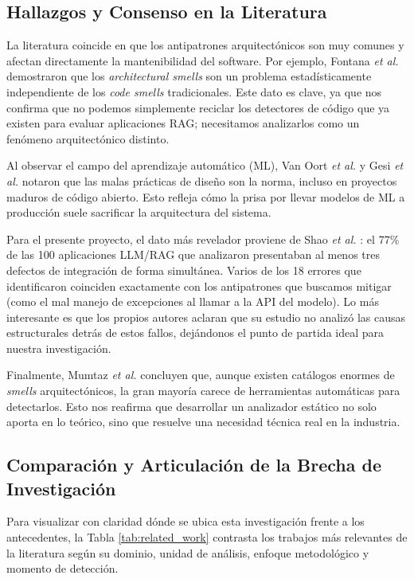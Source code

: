 \subsection{Hallazgos y Consenso en la Literatura}
La literatura coincide en que los antipatrones arquitectónicos son muy comunes y afectan directamente la mantenibilidad del software. Por ejemplo, Fontana \textit{et al.} \cite{arcelli_fontana_are_2019} demostraron que los \textit{architectural smells} son un problema estadísticamente independiente de los \textit{code smells} tradicionales. Este dato es clave, ya que nos confirma que no podemos simplemente reciclar los detectores de código que ya existen para evaluar aplicaciones RAG; necesitamos analizarlos como un fenómeno arquitectónico distinto.

Al observar el campo del aprendizaje automático (ML), Van Oort \textit{et al.} \cite{oort_prevalence_2021} y Gesi \textit{et al.} \cite{gesi_code_2022} notaron que las malas prácticas de diseño son la norma, incluso en proyectos maduros de código abierto. Esto refleja cómo la prisa por llevar modelos de ML a producción suele sacrificar la arquitectura del sistema.

Para el presente proyecto, el dato más revelador proviene de Shao \textit{et al.} \cite{shao_are_2024}: el 77\% de las 100 aplicaciones LLM/RAG que analizaron presentaban al menos tres defectos de integración de forma simultánea. Varios de los 18 errores que identificaron coinciden exactamente con los antipatrones que buscamos mitigar (como el mal manejo de excepciones al llamar a la API del modelo). Lo más interesante es que los propios autores aclaran que su estudio no analizó las causas estructurales detrás de estos fallos, dejándonos el punto de partida ideal para nuestra investigación.

Finalmente, Mumtaz \textit{et al.} \cite{mumtaz_systematic_2021} concluyen que, aunque existen catálogos enormes de \textit{smells} arquitectónicos, la gran mayoría carece de herramientas automáticas para detectarlos. Esto nos reafirma que desarrollar un analizador estático no solo aporta en lo teórico, sino que resuelve una necesidad técnica real en la industria.

\subsection{Comparación y Articulación de la Brecha de Investigación}

Para visualizar con claridad dónde se ubica esta investigación frente a los antecedentes, la Tabla \ref{tab:related_work} contrasta los trabajos más relevantes de la literatura según su dominio, unidad de análisis, enfoque metodológico y momento de detección.
 
